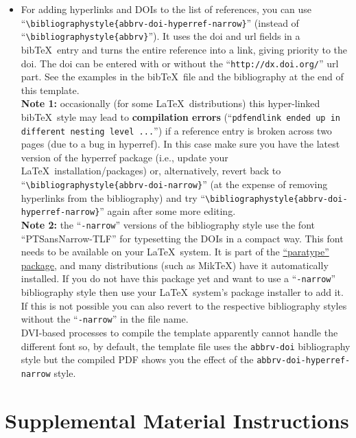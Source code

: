 \documentclass[journal]{vgtc}                %
\begin{document}
\begin{itemize}
	\item For adding hyperlinks and DOIs to the list of references, you can use ``\texttt{\textbackslash bibliographystyle\{abbrv-doi-hyperref-narrow\}}'' (instead of ``\texttt{\textbackslash bibliographystyle\{abbrv\}}'').
		It uses the doi and url fields in a bib\TeX\ entry and turns the entire reference into a link, giving priority to the doi.
		The doi can be entered with or without the ``\texttt{http://dx.doi.org/}'' url part.
		See the examples in the bib\TeX\ file and the bibliography at the end of this template.\\[1em]
		\textbf{Note 1:} occasionally (for some \LaTeX\ distributions) this hyper-linked bib\TeX\ style may lead to \textbf{compilation errors} (``\texttt{pdfendlink ended up in different nesting level ...}'') if a reference entry is broken across two pages (due to a bug in hyperref).
		In this case make sure you have the latest version of the hyperref package (i.e., update your \LaTeX\ installation/packages) or, alternatively, revert back to ``\texttt{\textbackslash bibliographystyle\{abbrv-doi-narrow\}}'' (at the expense of removing hyperlinks from the bibliography) and try ``\texttt{\textbackslash bibliographystyle\{abbrv-doi-hyperref-narrow\}}'' again after some more editing.\\[1em]
		\textbf{Note 2:} the ``\texttt{-narrow}'' versions of the bibliography style use the font ``PTSansNarrow-TLF'' for typesetting the DOIs in a compact way.
		This font needs to be available on your \LaTeX\ system.
		It is part of the \href{https://www.ctan.org/pkg/paratype}{``paratype'' package}, and many distributions (such as MikTeX) have it automatically installed.
		If you do not have this package yet and want to use a ``\texttt{-narrow}'' bibliography style then use your \LaTeX\ system's package installer to add it.
		If this is not possible you can also revert to the respective bibliography styles without the ``\texttt{-narrow}'' in the file name.\\[1em]
		DVI-based processes to compile the template apparently cannot handle the different font so, by default, the template file uses the \texttt{abbrv-doi} bibliography style but the compiled PDF shows you the effect of the \texttt{abbrv-doi-hyperref-narrow} style.
\end{itemize}


\section{Supplemental Material Instructions}
\end{document}
